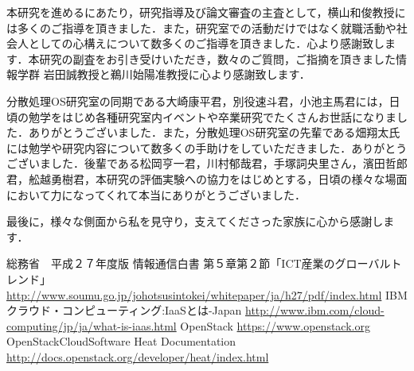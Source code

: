 \documentclass[mingoth]{kut-paper}		%
\begin{document}

\begin{acknowledgement}
本研究を進めるにあたり，研究指導及び論文審査の主査として，横山和俊教授には多くのご指導を頂きました．また，研究室での活動だけではなく就職活動や社会人としての心構えについて数多くのご指導を頂きました．心より感謝致します．本研究の副査をお引き受けいただき，数々のご質問，ご指摘を頂きました情報学群 岩田誠教授と鵜川始陽准教授に心より感謝致します．

分散処理OS研究室の同期である大崎康平君，別役速斗君，小池主馬君には，日頃の勉学をはじめ各種研究室内イベントや卒業研究でたくさんお世話になりました．ありがとうございました．また，分散処理OS研究室の先輩である畑翔太氏には勉学や研究内容について数多くの手助けをしていただきました．ありがとうございました．後輩である松岡亨一君，川村郁哉君，手塚詞央里さん，濱田哲郎君，舩越勇樹君，本研究の評価実験への協力をはじめとする，日頃の様々な場面において力になってくれて本当にありがとうございました．

最後に，様々な側面から私を見守り，支えてくださった家族に心から感謝します．
%
\end{acknowledgement}


\begin{thebibliography}{99}
%
総務省　平成２７年度版 情報通信白書 第５章第２節「ICT産業のグローバルトレンド」 				\url{http://www.soumu.go.jp/johotsusintokei/whitepaper/ja/h27/pdf/index.html}
IBMクラウド・コンピューティング:IaaSとは-Japan
\url{http://www.ibm.com/cloud-computing/jp/ja/what-is-iaas.html}
OpenStack
\url{https://www.openstack.org}
OpenStackCloudSoftware Heat Documentation
\url{http://docs.openstack.org/developer/heat/index.html}
\end{thebibliography}



%

%
\end{document}
